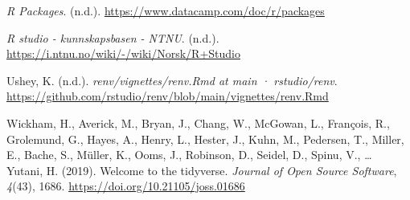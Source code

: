 \documentclass[
  a4paper,
]{article}
\newlength{\cslhangindent}
\newenvironment{CSLReferences}[2] %
 {\begin{list}{}{%
  \setlength{\itemindent}{0pt}
  \setlength{\leftmargin}{0pt}
  \setlength{\parsep}{0pt}
  \ifodd #1
   \setlength{\leftmargin}{\cslhangindent}
   \setlength{\itemindent}{-1\cslhangindent}
  \fi
  \setlength{\itemsep}{#2\baselineskip}}}
 {\end{list}}
\begin{document}
\begin{CSLReferences}{1}{0}
\emph{R Packages}. (n.d.). \url{https://www.datacamp.com/doc/r/packages}

\emph{R studio - kunnskapsbasen - NTNU}. (n.d.).
\url{https://i.ntnu.no/wiki/-/wiki/Norsk/R+Studio}

Ushey, K. (n.d.). \emph{renv/vignettes/renv.Rmd at main · rstudio/renv}.
\url{https://github.com/rstudio/renv/blob/main/vignettes/renv.Rmd}

Wickham, H., Averick, M., Bryan, J., Chang, W., McGowan, L., François,
R., Grolemund, G., Hayes, A., Henry, L., Hester, J., Kuhn, M., Pedersen,
T., Miller, E., Bache, S., Müller, K., Ooms, J., Robinson, D., Seidel,
D., Spinu, V., \ldots{} Yutani, H. (2019). Welcome to the tidyverse.
\emph{Journal of Open Source Software}, \emph{4}(43), 1686.
\url{https://doi.org/10.21105/joss.01686}

\end{CSLReferences}
\end{document}
